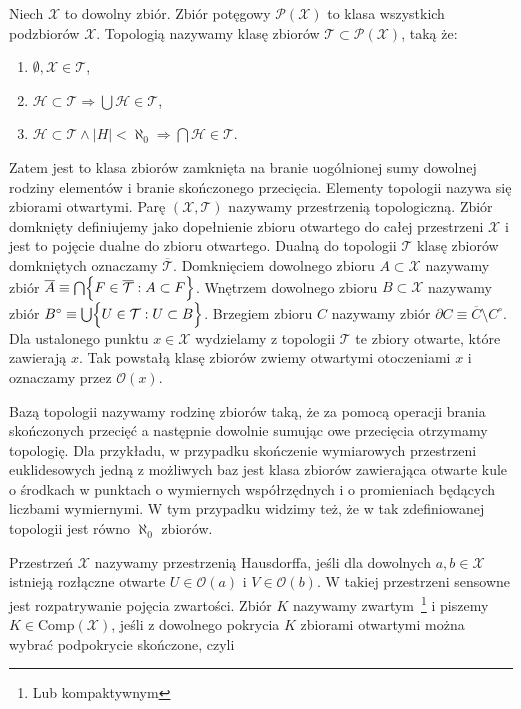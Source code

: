 Niech $ \mathcal{X} $ to dowolny zbiór. Zbiór potęgowy $ \mathcal{P}(\mathcal{X}) $ to klasa wszystkich podzbiorów $ \mathcal{X} $. Topologią nazywamy klasę zbiorów $ \mathcal{T} \subset \mathcal{P}(\mathcal{X})$, taką że:

\begin{enumerate}
	\item{$ \emptyset, \mathcal{X} \in \mathcal{T}$,}
	\item{$ \mathcal{H} \subset \mathcal{T} \Longrightarrow \bigcup \mathcal{H} \in \mathcal{T}$,}
	\item{$ \mathcal{H} \subset \mathcal{T} \wedge |H|<\aleph_0 \Longrightarrow \bigcap \mathcal{H} \in \mathcal{T} $.}
\end{enumerate}

Zatem jest to klasa zbiorów zamknięta na branie uogólnionej sumy dowolnej rodziny elementów i branie skończonego przecięcia. Elementy topologii nazywa się zbiorami otwartymi. Parę $ (\mathcal{X}, \mathcal{T})$ nazywamy przestrzenią topologiczną. Zbiór domknięty definiujemy jako dopełnienie zbioru otwartego do całej przestrzeni $ \mathcal{X} $ i jest to pojęcie dualne do zbioru otwartego. Dualną do topologii $ \mathcal{T} $ klasę zbiorów domkniętych oznaczamy $ \overline{\mathcal{T}} $. Domknięciem dowolnego zbioru $ A \subset \mathcal{X} $ nazywamy zbiór $ \overline{A} \equiv \bigcap \Bigl \{ F \in \overline{ \mathcal{T} } : A \subset F \Bigl\}$. Wnętrzem dowolnego zbioru $ B \subset \mathcal{X}$ nazywamy zbiór $ B^{\circ} \equiv \bigcup \Bigl\{ U \in \mathcal{T} : U \subset B  \Bigl \}$. Brzegiem zbioru $ C $ nazywamy zbiór $ \partial{C} \equiv \overline{C} \setminus C^{\circ}  $. Dla ustalonego punktu $ x \in \mathcal{X} $ wydzielamy z topologii $ \mathcal{T} $ te zbiory otwarte, które zawierają $ x $. Tak powstałą klasę zbiorów zwiemy otwartymi otoczeniami $ x $ i oznaczamy przez $ \mathcal{O}(x) $. 

Bazą topologii nazywamy rodzinę zbiorów taką, że za pomocą operacji brania skończonych przecięć a następnie dowolnie sumując owe przecięcia otrzymamy topologię. Dla przykładu, w przypadku skończenie wymiarowych przestrzeni euklidesowych jedną z możliwych baz jest klasa zbiorów zawierająca otwarte kule o środkach w punktach o wymiernych współrzędnych i o promieniach będących liczbami wymiernymi. W tym przypadku widzimy też, że w tak zdefiniowanej topologii jest równo $\aleph_0$ zbiorów. 

Przestrzeń $ \mathcal{X} $ nazywamy przestrzenią Hausdorffa, jeśli dla dowolnych $ a, b \in \mathcal{X} $ istnieją rozłączne otwarte $ U \in \mathcal{O}(a)$ i $ V \in \mathcal{O}(b) $. W takiej przestrzeni sensowne jest rozpatrywanie pojęcia zwartości. Zbiór $ K $ nazywamy zwartym~\footnote{Lub kompaktywnym} i piszemy $ K \in \mathrm{Comp}(\mathcal{X}) $, jeśli z dowolnego pokrycia $ K $ zbiorami otwartymi można wybrać podpokrycie skończone, czyli

